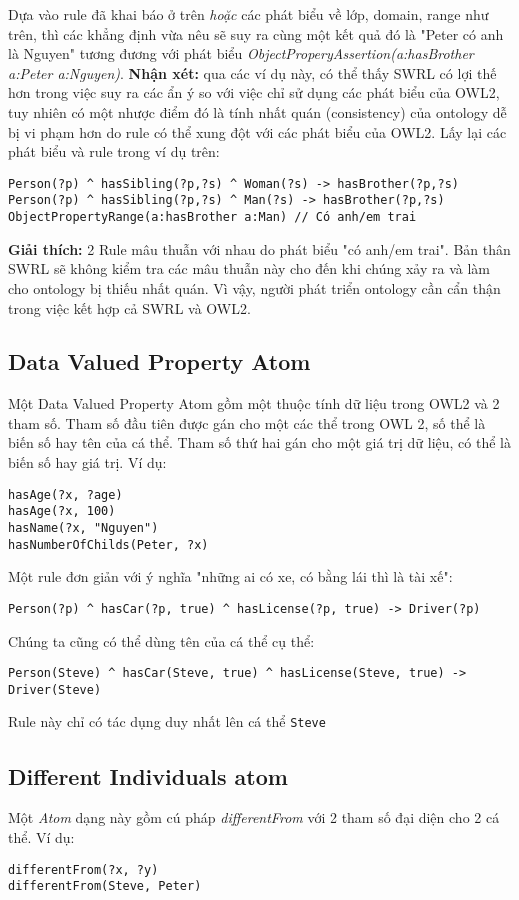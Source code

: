 Dựa vào rule đã khai báo ở trên \textit{hoặc} các phát biểu về lớp, domain, range như trên, thì các khẳng định vừa nêu sẽ suy ra cùng một kết quả đó là "Peter có anh là Nguyen" tương đương với phát biểu \textit{ObjectProperyAssertion(a:hasBrother a:Peter a:Nguyen)}.
\textbf{Nhận xét:} qua các ví dụ này, có thể thấy SWRL có lợi thế hơn trong việc suy ra các ẩn ý so với việc chỉ sử dụng các phát biểu của OWL2, tuy nhiên có một nhược điểm đó là tính nhất quán (consistency) của ontology dễ bị vi phạm hơn do rule có thể xung đột với các phát biểu của OWL2. Lấy lại các phát biểu và rule trong ví dụ trên:
\begin{verbatim}
Person(?p) ^ hasSibling(?p,?s) ^ Woman(?s) -> hasBrother(?p,?s)
Person(?p) ^ hasSibling(?p,?s) ^ Man(?s) -> hasBrother(?p,?s)
ObjectPropertyRange(a:hasBrother a:Man) // Có anh/em trai
\end{verbatim}
\textbf{Giải thích:} 2 Rule mâu thuẫn với nhau do phát biểu "có anh/em trai". Bản thân SWRL sẽ không kiểm tra các mâu thuẫn này cho đến khi chúng xảy ra và làm cho ontology bị thiếu nhất quán. Vì vậy, người phát triển ontology cần cẩn thận trong việc kết hợp cả SWRL và OWL2.

\subsection{Data Valued Property Atom}
Một Data Valued Property Atom gồm một thuộc tính dữ liệu trong OWL2 và 2 tham số. Tham số đầu tiên được gán cho một các thể trong OWL 2, số thể là biến số hay tên của cá thể. Tham số thứ hai gán cho một giá trị dữ liệu, có thể là biến số hay giá trị. Ví dụ:
\begin{verbatim}
hasAge(?x, ?age)
hasAge(?x, 100)
hasName(?x, "Nguyen")
hasNumberOfChilds(Peter, ?x)
\end{verbatim}
Một rule đơn giản với ý nghĩa "những ai có xe, có bằng lái thì là tài xế":
\begin{verbatim}
Person(?p) ^ hasCar(?p, true) ^ hasLicense(?p, true) -> Driver(?p)
\end{verbatim}
Chúng ta cũng có thể dùng tên của cá thể cụ thể:
\begin{verbatim}
Person(Steve) ^ hasCar(Steve, true) ^ hasLicense(Steve, true) -> Driver(Steve)
\end{verbatim}
Rule này chỉ có tác dụng duy nhất lên cá thể \verb|Steve|

\subsection{Different Individuals atom}
Một \textit{Atom} dạng này gồm cú pháp \textit{differentFrom} với 2 tham số đại diện cho 2 cá thể. Ví dụ:
\begin{verbatim}
differentFrom(?x, ?y)
differentFrom(Steve, Peter)
\end{verbatim}

